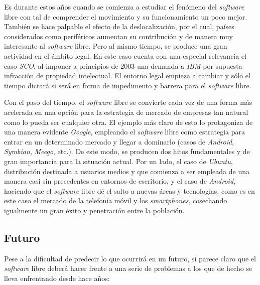 Es durante estos años cuando se comienza a estudiar el fenómeno del
\textit{software} libre con tal de comprender el movimiento y su funcionamiento
un poco mejor. También se hace palpable el efecto de la deslocalización, por el
cual, países considerados como periféricos aumentan su contribución y de manera
muy interesante al \textit{software} libre. Pero al mismo tiempo, se produce una
gran actividad en el ámbito legal. En este caso cuenta con una especial
relevancia el caso \textit{SCO}, al imponer a principios de 2003 una demanda a
\textit{IBM} por supuesta infracción de propiedad intelectual. El entorno legal
empieza a cambiar y sólo el tiempo dictará si será en forma de impedimento y
barrera para el \textit{software} libre.

Con el paso del tiempo, el \textit{software} libre se convierte cada vez de una
forma más acelerada en una opción para la estrategia de mercado de empresas tan
natural como lo pueda ser cualquier otra. El ejemplo más claro de esto lo
protagoniza de una manera evidente \textit{Google}, empleando el
\textit{software} libre como estrategia para entrar en un determinado mercado y
llegar a dominarlo (casos de \textit{Android}, \textit{Symbian}, \textit{Meego},
etc.). De este modo, se producen dos hitos fundamentales y de gran importancia
para la situación actual. Por un lado, el caso de \textit{Ubuntu}, distribución
destinada a usuarios medios y que comienza a ser empleada de una manera casi sin
precedentes en entornos de escritorio, y el caso de \textit{Android}, haciendo
que el \textit{software} libre dé el salto a nuevas áreas y tecnologías, como es
en este caso el mercado de la telefonía móvil y los \textit{smartphones},
cosechando igualmente un gran éxito y penetración entre la población.

\subsection{Futuro}

Pese a la dificultad de predecir lo que ocurrirá en un futuro, sí parece claro
que el \textit{software} libre deberá hacer frente a una serie de problemas a
los que de hecho se lleva enfrentando desde hace años:

